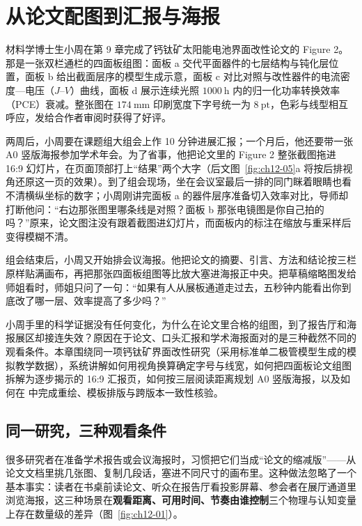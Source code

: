 \chapter{从论文配图到汇报与海报}

材料学博士生小周在第 9 章完成了钙钛矿太阳能电池界面改性论文的 Figure 2。那是一张双栏通栏的四面板组图：面板 a 交代平面器件的七层结构与钝化层位置，面板 b 给出截面层序的模型生成示意，面板 c 对比对照与改性器件的电流密度—电压（$J\text{--}V$）曲线，面板 d 展示连续光照 $1000\ \text{h}$ 内的归一化功率转换效率（PCE）衰减。整张图在 $174\ \text{mm}$ 印刷宽度下字号统一为 $8\ \text{pt}$，色彩与线型相互呼应，发给合作者审阅时获得了好评。

两周后，小周要在课题组大组会上作 10 分钟进展汇报；一个月后，他还要带一张 A0 竖版海报参加学术年会。为了省事，他把论文里的 Figure 2 整张截图拖进 16:9 幻灯片，在页面顶部打上“结果”两个大字（后文图~\ref{fig:ch12-05}a 将按后排视角还原这一页的效果）。到了组会现场，坐在会议室最后一排的同门眯着眼睛也看不清横纵坐标的数字；小周刚讲完面板 a 的器件层序准备切入效率对比，导师却打断他问：“右边那张图里哪条线是对照？面板 b 那张电镜图是你自己拍的吗？”原来，论文图注没有跟着截图进幻灯片，而面板内的标注在缩放与重采样后变得模糊不清。

组会结束后，小周又开始排会议海报。他把论文的摘要、引言、方法和结论按三栏原样贴满画布，再把那张四面板组图等比放大塞进海报正中央。把草稿缩略图发给师姐看时，师姐只问了一句：“如果有人从展板通道走过去，五秒钟内能看出你到底改了哪一层、效率提高了多少吗？”

小周手里的科学证据没有任何变化，为什么在论文里合格的组图，到了报告厅和海报展区却接连失效？原因在于论文、口头汇报和学术海报面对的是三种截然不同的观看条件。本章围绕同一项钙钛矿界面改性研究（采用标准单二极管模型生成的模拟教学数据），系统讲解如何用视角换算确定字号与线宽，如何把四面板论文组图拆解为逐步揭示的 16:9 汇报页，如何按三层阅读距离规划 A0 竖版海报，以及如何在 \scidraw{} 中完成重绘、模板排版与跨版本一致性核验。

\section{同一研究，三种观看条件}

很多研究者在准备学术报告或会议海报时，习惯把它们当成“论文的缩减版”——从论文文档里挑几张图、复制几段话，塞进不同尺寸的画布里。这种做法忽略了一个基本事实：读者在书桌前读论文、听众在报告厅看投影屏幕、参会者在展厅通道里浏览海报，这三种场景在\textbf{观看距离、可用时间、节奏由谁控制}三个物理与认知变量上存在数量级的差异（图~\ref{fig:ch12-01}）。

